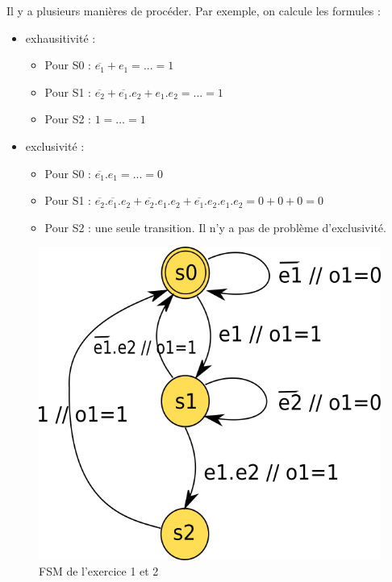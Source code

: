 \documentclass[a4paper,11pt]{article}
\begin{document}
Il y a plusieurs manières de procéder. Par exemple, on calcule les formules :

\begin{itemize}
\item exhausitivité :

\begin{itemize}
\item Pour S0 : $\overline{e_1}+e_1=...=1$
\item Pour S1 : $\overline{e_2}+\overline{e_1}.e_2+e_1.e_2=...=1$
\item Pour S2 : $1=\dots=1$
\end{itemize}

\item exclusivité :
\begin{itemize}
\item Pour S0 : $\overline{e_1}.e_1=...=0$
\item Pour S1 : $\overline{e_2}.\overline{e_1}.e_2+\overline{e_2}.e_1.e_2+\overline{e_1}.e_2.e_1.e_2=0+0+0=0$
\item Pour S2 : une seule transition. Il n'y a pas de problème d'exclusivité.
\end{itemize}

\end{itemize}

\begin{figure}[!h]
\begin{center}
\includegraphics[scale=0.3]{./figures/ex-fsm-1.png}
\end{center}
\caption{FSM de l'exercice 1 et 2}
\label{fig2}
\end{figure}
\end{document}
